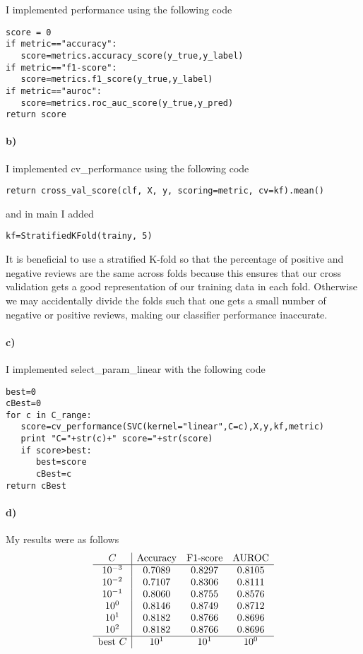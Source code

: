 \documentclass[12pt]{article}
\begin{document}
I implemented performance using the following code
\begin{verbatim}
score = 0
if metric=="accuracy":
   score=metrics.accuracy_score(y_true,y_label)
if metric=="f1-score":
   score=metrics.f1_score(y_true,y_label)
if metric=="auroc":
   score=metrics.roc_auc_score(y_true,y_pred)
return score
\end{verbatim}

\paragraph{b)}

I implemented cv\_performance using the following code
\begin{verbatim}
return cross_val_score(clf, X, y, scoring=metric, cv=kf).mean()
\end{verbatim}
and in main I added
\begin{verbatim}
kf=StratifiedKFold(trainy, 5)
\end{verbatim}

It is beneficial to use a stratified K-fold so that the percentage of positive and negative reviews are the same across folds
because this ensures that our cross validation gets a good representation of our training data in each fold. Otherwise
we may accidentally divide the folds such that one gets a small number of negative or positive reviews, making our classifier
performance inaccurate.

\paragraph{c)}

I implemented select\_param\_linear with the following code
\begin{verbatim}
best=0
cBest=0
for c in C_range:
   score=cv_performance(SVC(kernel="linear",C=c),X,y,kf,metric)
   print "C="+str(c)+" score="+str(score)
   if score>best:
      best=score
      cBest=c
return cBest
\end{verbatim}

\paragraph{d)}

My results were as follows
\[
        \begin{array}{c|c c c}
                C & \text{Accuracy} & \text{F1-score} & \text{AUROC}\\
                \hline
                10^{-3} & 0.7089 & 0.8297 & 0.8105\\
                10^{-2} & 0.7107 & 0.8306 & 0.8111\\
                10^{-1} & 0.8060 & 0.8755 & 0.8576\\
                10^0 & 0.8146 & 0.8749 & 0.8712\\
                10^1 & 0.8182 & 0.8766 & 0.8696\\
                10^2 & 0.8182 & 0.8766 & 0.8696\\
                \hline
                \text{best } C & 10^1 & 10^1 & 10^0
        \end{array}
\]
\end{document}
